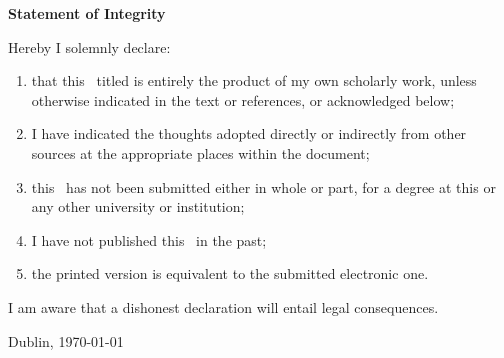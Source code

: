 \clearpage
\thispagestyle{empty}

{\LARGE\textsf{\textbf{Statement of Integrity}}}


Hereby I solemnly declare:
\begin{enumerate}
    \item that this \typMeinerArbeit\, titled \emph{\themaMeinerArbeit} is entirely the product of my own scholarly work, unless otherwise
    indicated in the text or references, or acknowledged below;

    \item I have indicated the thoughts adopted directly or indirectly from other sources at
    the appropriate places within the document;

    \item this \typMeinerArbeit\ has not been submitted either in whole or
    part, for a degree at this or any other university or institution;

    \item  I have not published this \typMeinerArbeit\ in the past;

    \item the printed version is equivalent to the submitted electronic one.
\end{enumerate}
I am aware that a dishonest declaration will entail legal consequences.


\vspace{2cm}

Dublin, \today


